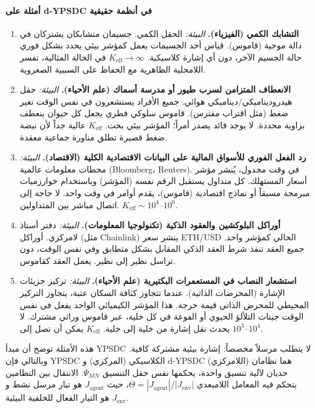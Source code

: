 \documentclass[11pt,a4paper]{article}
\begin{document}
	\paragraph*{أمثلة على d‑YPSDC في أنظمة حقيقية}
	\begin{enumerate}[leftmargin=*]
		\item \textbf{التشابك الكمي (الفيزياء).}
		\textit{البيئة:} الحقل الكمي. جسيمان متشابكان يشتركان في دالة موجية (قاموس). قياس أحد الجسيمات يعمل كمؤشر بيئي يحدد بشكل فوري حالة الجسيم الآخر، دون أي إشارة كلاسيكية. $K_{\mathrm{eff}}\to\infty$ في الحالة المثالية، تفسر اللامحلية الظاهرية مع الحفاظ على السببية الصغروية.
		
		\item \textbf{الانعطاف المتزامن لسرب طيور أو مدرسة أسماك (علم الأحياء).}
		\textit{البيئة:} حقل هيدروديناميكي/ديناميكي هوائي. جميع الأفراد يستشعرون في نفس الوقت تغير ضغط (مثل اقتراب مفترس). قاموس سلوكي فطري يجعل كل حيوان ينعطف بزاوية محددة. لا يوجد قائد يصدر أمراً؛ المؤشر بيئي بحت. $K_{\mathrm{eff}}$ عالية جداً لأن نبضة ضغط قصيرة تطلق مناورة جماعية معقدة.
		
		\item \textbf{رد الفعل الفوري للأسواق المالية على البيانات الاقتصادية الكلية (الاقتصاد).}
		\textit{البيئة:} محطات معلومات عالمية (Bloomberg، Reuters). في وقت مجدول، يُنشر مؤشر أسعار المستهلك. كل متداول يستقبل الرقم نفسه (المؤشر) وباستخدام خوارزميات مبرمجة مسبقاً أو نماذج اقتصادية (قاموس)، يقدم أوامر في وقت واحد. لا حاجة إلى اتصال مباشر بين المتداولين. $K_{\mathrm{eff}}\sim 10^{4}$--$10^{6}$.
		
		\item \textbf{أوراكل البلوكشين والعقود الذكية (تكنولوجيا المعلومات).}
		\textit{البيئة:} دفتر أستاذ لامركزي. أوراكل (مثل Chainlink) ينشر سعر ETH/USD الحالي كمؤشر واحد. جميع العقد تنفذ شرط العقد الذكي المقابل بشكل متطابق وفي نفس الوقت، دون تراسل نظير إلى نظير. يعمل العقد كقاموس.
		
		\item \textbf{استشعار النصاب في المستعمرات البكتيرية (علم الأحياء).}
		\textit{البيئة:} تركيز جزيئات الإشارة (المحرضات الذاتية). عندما تتجاوز كثافة السكان عتبة، يتجاوز التركيز المحيطي للمحرض الذاتي قيمة حرجة. هذا المؤشر الكيميائي الواحد يفعل في نفس الوقت جينات التلألؤ الحيوي أو الفوعة في كل خلية، عبر قاموس وراثي مشترك. لا يحدث نقل إشارة من خلية إلى خلية. $K_{\mathrm{eff}}$ يمكن أن تصل إلى $10^{3}$--$10^{4}$.
	\end{enumerate}
	
	هذه الأمثلة توضح أن مبدأ YPSDC لا يتطلب مرسلاً مخصصاً: إشارة بيئية مشتركة كافية. وبالتالي فإن YPSDC الكلاسيكي (المركزي) و d‑YPSDC (اللامركزي) هما نظامان حديان لآلية تنسيق واحدة، يحكمها نفس حقل التنسيق $\Psi_{MN}$. الانتقال بين النظامين يتحكم فيه المعامل اللامبعدي $\Theta = |J_{\mathrm{agent}}|/|J_{\mathrm{env}}|$، حيث $J_{\mathrm{agent}}$ هو تيار مرسل نشط و $J_{\mathrm{env}}$ هو التيار الفعال للخلفية البيئية.
	
\end{document}

